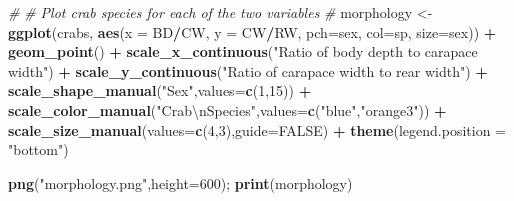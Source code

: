 \documentclass[11pt,]{article}
\newenvironment{Shaded}{\begin{snugshade}}{\end{snugshade}}
\newcommand{\CharTok}[1]{\textcolor[rgb]{0.31,0.60,0.02}{#1}}
\newcommand{\CommentTok}[1]{\textcolor[rgb]{0.56,0.35,0.01}{\textit{#1}}}
\newcommand{\DataTypeTok}[1]{\textcolor[rgb]{0.13,0.29,0.53}{#1}}
\newcommand{\DecValTok}[1]{\textcolor[rgb]{0.00,0.00,0.81}{#1}}
\newcommand{\KeywordTok}[1]{\textcolor[rgb]{0.13,0.29,0.53}{\textbf{#1}}}
\newcommand{\NormalTok}[1]{#1}
\newcommand{\OperatorTok}[1]{\textcolor[rgb]{0.81,0.36,0.00}{\textbf{#1}}}
\newcommand{\OtherTok}[1]{\textcolor[rgb]{0.56,0.35,0.01}{#1}}
\newcommand{\StringTok}[1]{\textcolor[rgb]{0.31,0.60,0.02}{#1}}
\begin{document}
\begin{Shaded}
\begin{Highlighting}[]
\CommentTok{#}
\CommentTok{# Plot crab species for each of the two variables}
\CommentTok{#}
\NormalTok{morphology <-}\StringTok{ }\KeywordTok{ggplot}\NormalTok{(crabs, }\KeywordTok{aes}\NormalTok{(}\DataTypeTok{x =}\NormalTok{ BD}\OperatorTok{/}\NormalTok{CW, }\DataTypeTok{y =}\NormalTok{ CW}\OperatorTok{/}\NormalTok{RW, }\DataTypeTok{pch=}\NormalTok{sex, }\DataTypeTok{col=}\NormalTok{sp, }\DataTypeTok{size=}\NormalTok{sex)) }\OperatorTok{+}
\StringTok{        }\KeywordTok{geom_point}\NormalTok{()                                                        }\OperatorTok{+}
\StringTok{        }\KeywordTok{scale_x_continuous}\NormalTok{(}\StringTok{"Ratio of body depth to carapace width"}\NormalTok{)         }\OperatorTok{+}
\StringTok{        }\KeywordTok{scale_y_continuous}\NormalTok{(}\StringTok{"Ratio of carapace width to rear width"}\NormalTok{)         }\OperatorTok{+}
\StringTok{        }\KeywordTok{scale_shape_manual}\NormalTok{(}\StringTok{"Sex"}\NormalTok{,}\DataTypeTok{values=}\KeywordTok{c}\NormalTok{(}\DecValTok{1}\NormalTok{,}\DecValTok{15}\NormalTok{))                            }\OperatorTok{+}
\StringTok{        }\KeywordTok{scale_color_manual}\NormalTok{(}\StringTok{"Crab}\CharTok{\textbackslash{}n}\StringTok{Species"}\NormalTok{,}\DataTypeTok{values=}\KeywordTok{c}\NormalTok{(}\StringTok{"blue"}\NormalTok{,}\StringTok{"orange3"}\NormalTok{))      }\OperatorTok{+}
\StringTok{        }\KeywordTok{scale_size_manual}\NormalTok{(}\DataTypeTok{values=}\KeywordTok{c}\NormalTok{(}\DecValTok{4}\NormalTok{,}\DecValTok{3}\NormalTok{),}\DataTypeTok{guide=}\OtherTok{FALSE}\NormalTok{)                        }\OperatorTok{+}
\StringTok{        }\KeywordTok{theme}\NormalTok{(}\DataTypeTok{legend.position =} \StringTok{"bottom"}\NormalTok{)}


\KeywordTok{png}\NormalTok{(}\StringTok{"morphology.png"}\NormalTok{,}\DataTypeTok{height=}\DecValTok{600}\NormalTok{); }\KeywordTok{print}\NormalTok{(morphology)}


\end{Highlighting}
\end{Shaded}
\end{document}
